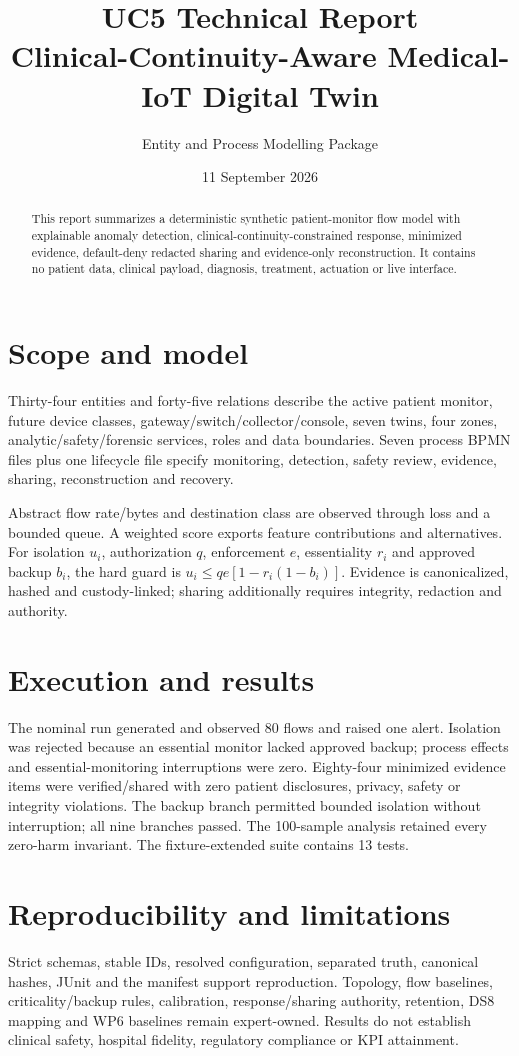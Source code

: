 \documentclass[11pt,a4paper]{article}
\title{UC5 Technical Report\\\large Clinical-Continuity-Aware Medical-IoT Digital Twin}
\author{Entity and Process Modelling Package}\date{11 September 2026}
\begin{document}
\maketitle
\begin{abstract}This report summarizes a deterministic synthetic patient-monitor flow model with explainable anomaly detection, clinical-continuity-constrained response, minimized evidence, default-deny redacted sharing and evidence-only reconstruction. It contains no patient data, clinical payload, diagnosis, treatment, actuation or live interface.\end{abstract}
\section{Scope and model}
Thirty-four entities and forty-five relations describe the active patient monitor, future device classes, gateway/switch/collector/console, seven twins, four zones, analytic/safety/forensic services, roles and data boundaries. Seven process BPMN files plus one lifecycle file specify monitoring, detection, safety review, evidence, sharing, reconstruction and recovery.

Abstract flow rate/bytes and destination class are observed through loss and a bounded queue. A weighted score exports feature contributions and alternatives. For isolation $u_i$, authorization $q$, enforcement $e$, essentiality $r_i$ and approved backup $b_i$, the hard guard is $u_i\le qe[1-r_i(1-b_i)]$. Evidence is canonicalized, hashed and custody-linked; sharing additionally requires integrity, redaction and authority.
\section{Execution and results}
The nominal run generated and observed 80 flows and raised one alert. Isolation was rejected because an essential monitor lacked approved backup; process effects and essential-monitoring interruptions were zero. Eighty-four minimized evidence items were verified/shared with zero patient disclosures, privacy, safety or integrity violations. The backup branch permitted bounded isolation without interruption; all nine branches passed. The 100-sample analysis retained every zero-harm invariant. The fixture-extended suite contains 13 tests.
\section{Reproducibility and limitations}
Strict schemas, stable IDs, resolved configuration, separated truth, canonical hashes, JUnit and the manifest support reproduction. Topology, flow baselines, criticality/backup rules, calibration, response/sharing authority, retention, DS8 mapping and WP6 baselines remain expert-owned. Results do not establish clinical safety, hospital fidelity, regulatory compliance or KPI attainment.
\end{document}
